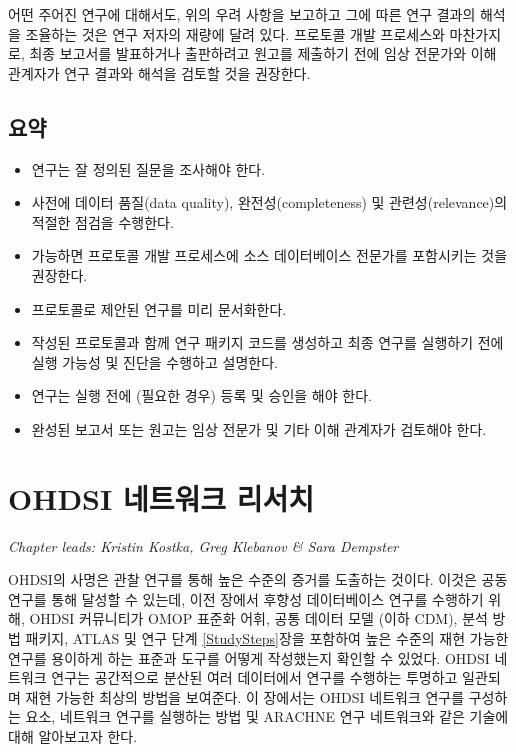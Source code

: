 \documentclass[11pt]{book}
\providecommand{\tightlist}{%
  \setlength{\itemsep}{0pt}\setlength{\parskip}{0pt}}
\theoremstyle{definition}
\theoremstyle{definition}
\theoremstyle{definition}
\theoremstyle{remark}
\let\BeginKnitrBlock\begin \let\EndKnitrBlock\end
\begin{document}
어떤 주어진 연구에 대해서도, 위의 우려 사항을 보고하고 그에 따른 연구
결과의 해석을 조율하는 것은 연구 저자의 재량에 달려 있다. 프로토콜 개발
프로세스와 마찬가지로, 최종 보고서를 발표하거나 출판하려고 원고를
제출하기 전에 임상 전문가와 이해 관계자가 연구 결과와 해석을 검토할 것을
권장한다.

\section{요약}\label{-17}

\BeginKnitrBlock{rmdsummary}
\begin{itemize}
\tightlist
\item
  연구는 잘 정의된 질문을 조사해야 한다.
\item
  사전에 데이터 품질(data quality), 완전성(completeness) 및
  관련성(relevance)의 적절한 점검을 수행한다.
\item
  가능하면 프로토콜 개발 프로세스에 소스 데이터베이스 전문가를
  포함시키는 것을 권장한다.
\item
  프로토콜로 제안된 연구를 미리 문서화한다.
\item
  작성된 프로토콜과 함께 연구 패키지 코드를 생성하고 최종 연구를
  실행하기 전에 실행 가능성 및 진단을 수행하고 설명한다.
\item
  연구는 실행 전에 (필요한 경우) 등록 및 승인을 해야 한다.
\item
  완성된 보고서 또는 원고는 임상 전문가 및 기타 이해 관계자가 검토해야
  한다.
\end{itemize}
\EndKnitrBlock{rmdsummary}

\chapter{OHDSI 네트워크 리서치}\label{NetworkResearch}

\emph{Chapter leads: Kristin Kostka, Greg Klebanov \& Sara Dempster}

OHDSI의 사명은 관찰 연구를 통해 높은 수준의 증거를 도출하는 것이다.
이것은 공동 연구를 통해 달성할 수 있는데, 이전 장에서 후향성
데이터베이스 연구를 수행하기 위해, OHDSI 커뮤니티가 OMOP 표준화 어휘,
공통 데이터 모델 (이하 CDM), 분석 방법 패키지, ATLAS 및 연구 단계
\ref{StudySteps}장을 포함하여 높은 수준의 재현 가능한 연구를 용이하게
하는 표준과 도구를 어떻게 작성했는지 확인할 수 있었다. OHDSI 네트워크
연구는 공간적으로 분산된 여러 데이터에서 연구를 수행하는 투명하고
일관되며 재현 가능한 최상의 방법을 보여준다. 이 장에서는 OHDSI 네트워크
연구를 구성하는 요소, 네트워크 연구를 실행하는 방법 및 ARACHNE 연구
네트워크와 같은 기술에 대해 알아보고자 한다.
\end{document}
